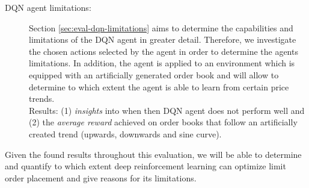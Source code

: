 \begin{description}
    \item[DQN agent limitations: ]
    Section \ref{sec:eval-dqn-limitations} aims to determine the capabilities and limitations of the DQN agent in greater detail.
    Therefore, we investigate the chosen actions selected by the agent in order to determine the agents limitations.
    In addition, the agent is applied to an environment which is equipped with an artificially generated order book and will allow to determine to which extent the agent is able to learn from certain price trends.
    \\
    Results: (1) \textit{insights} into when then DQN agent does not perform well and (2) the \textit{average reward} achieved on order books that follow an artificially created trend (upwards, downwards and sine curve).
\end{description}
Given the found results throughout this evaluation, we will be able to determine and quantify to which extent deep reinforcement learning can optimize limit order placement and give reasons for its limitations.

